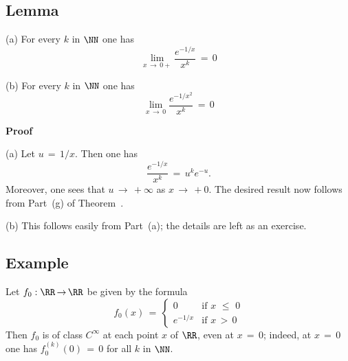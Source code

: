 \V

             \subsection{\small{\bf Lemma}}
            \label{LemmaE45.127H}
\V

\hspace*{\parindent}(a) For every $k$ in ${\NN}$ one has
        \begin{equation}
        \label{EqnE.83B}
        \lim_{x \,{\rightarrow}\, 0+} \frac{e^{-1/x}}{x^{k}} \,=\, 0
        \end{equation}

\V

        (b) For every $k$ in ${\NN}$ one has
        \begin{equation}
        \label{EqnE.83C}
        \lim_{x \,{\rightarrow}\, 0} \frac{e^{-1/x^{2}}}{x^{k}} \,=\, 0
        \end{equation}

\V

        {\bf Proof}\,

\V

        (a) Let $u \,=\, 1/x$. Then one has
        \begin{displaymath}
        \frac{e^{-1/x}}{x^{k}} \,=\, u^{k}e^{-u}.
        \end{displaymath}
    Moreover, one sees that $u \,{\rightarrow}\, +{\infty}$ as $x \,{\rightarrow}\,  +0$.
    The desired result now follows from Part~(g) of Theorem~.

\V

        (b) This follows easily from Part~(a); the details are left as an exercise. \Q


\V

             \subsection{\small{\bf Example}}
            \label{ExampE45.127J}

\V

        Let $f_{0}:{\RR} \,{\rightarrow}\, {\RR}$ be given by the formula
        \begin{displaymath}
        f_{0}(x) \,=\, \left\{
        \begin{array}{cl}
             0   & \mbox{if $x\,\,{\leq}\,\,0$} \\
        e^{-1/x} & \mbox{if $x\,>\,0$}
        \end{array}
                                \right.
        \end{displaymath}
    Then $f_{0}$ is of class $C^{{\infty}}$ at each point $x$ of ${\RR}$, even at $x \,=\, 0$;
    indeed, at $x \,=\, 0$ one has $f_{0}^{(k)}(0) \,=\, 0$ for all $k$ in ${\NN}$.

